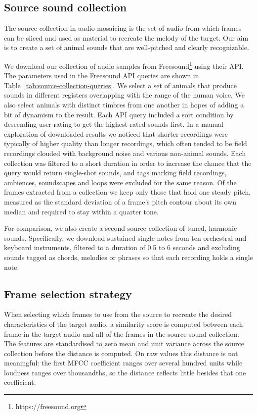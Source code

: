 \documentclass{article}
\begin{document}
\subsection{Source sound collection}

The source collection in audio mosaicing is the set of audio from which frames can be sliced and used as material to recreate the melody of the target.
Our aim is to create a set of animal sounds that are well-pitched and clearly recognizable.

We download our collection of audio samples from Freesound\footnote{https://freesound.org} using their API.
The parameters used in the Freesound API queries are shown in Table~\ref{tab:source-collection-queries}.
We select a set of animals that produce sounds in different registers overlapping with the range of the human voice.
We also select animals with distinct timbres from one another in hopes of adding a bit of dynamism to the result.
Each API query included a sort condition by descending user rating to get the highest-rated sounds first.
In a manual exploration of downloaded results we noticed that shorter recordings were typically of higher quality than longer recordings, which often tended to be field recordings clouded with background noise and various non-animal sounds.
Each collection was filtered to a short duration in order to increase the chance that the query would return single-shot sounds, and tags marking field recordings, ambiences, soundscapes and loops were excluded for the same reason.
Of the frames extracted from a collection we keep only those that hold one steady pitch, measured as the standard deviation of a frame's pitch contour about its own median and required to stay within a quarter tone.

For comparison, we also create a second source collection of tuned, harmonic sounds.
Specifically, we download sustained single notes from ten orchestral and keyboard instruments, filtered to a duration of 0.5 to 6 seconds and excluding sounds tagged as chords, melodies or phrases so that each recording holds a single note.


\subsection{Frame selection strategy}

When selecting which frames to use from the source to recreate the desired characteristics of the target audio, a similarity score is computed between each frame in the target audio and all of the frames in the source sound collection.
The features are standardised to zero mean and unit variance across the source collection before the distance is computed.
On raw values this distance is not meaningful: the first MFCC coefficient ranges over several hundred units while loudness ranges over thousandths, so the distance reflects little besides that one coefficient.
\end{document}
